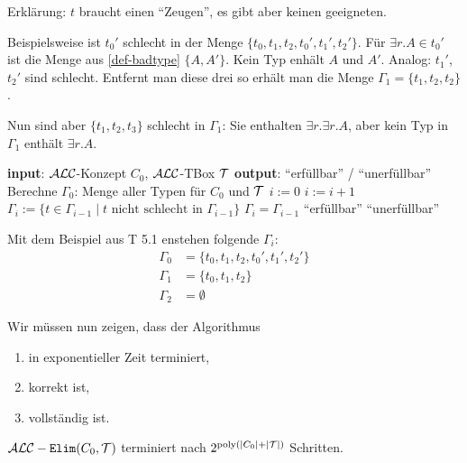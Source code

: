 Erklärung: $t$ braucht einen \enquote{Zeugen}, es gibt aber keinen
geeigneten.

\begin{tafel}[continues=t:synTyp]

    Beispielsweise ist $t_0'$ schlecht in der Menge $\{t_0,t_1,t_2,t_0',t_1',t_2'\}$. Für $\exists r.A \in t_0'$ ist die Menge aus \autoref{def-badtype} $\{A,A'\}$. Kein Typ enhält $A$ und $A'$. Analog: $t_1'$, $t_2'$ sind schlecht. Entfernt man diese drei so erhält man die Menge $\Gamma_1 = \{t_1,t_2,t_2\}$. 

Nun sind aber $\{t_1,t_2,t_3\}$ schlecht in $\Gamma_1$: Sie enthalten $\exists r. \exists r.A$, aber kein Typ in $\Gamma_1$ enthält $\exists r.A$.
\end{tafel}

\begin{algorithmic}
    \State \textbf{input}: $\mathcal{A}\mathcal{L}\mathcal{C}$-Konzept $C_0$, $\mathcal{A}\mathcal{L}\mathcal{C}$-TBox $\mathcal{T}$
    \State \textbf{output}: \enquote{erfüllbar} / \enquote{unerfüllbar}
    \State Berechne $\Gamma_0$: Menge aller Typen für $C_0$ und $\mathcal{T}$
    \State $i := 0$
    \Repeat
        \State $i := i + 1$
        \State $\Gamma_i := \{ t \in \Gamma_{i - 1} \mid t \text{ nicht schlecht in } \Gamma_{i - 1}\}$
    \Until $\Gamma_i = \Gamma_{i - 1}$
        \Return \enquote{erfüllbar}
    \Else{}
        \Return \enquote{unerfüllbar}
    \EndIf
    \EndProcedure{}
\end{algorithmic}

\begin{tafel}[continues=t:synTyp]
    Mit dem Beispiel aus T 5.1 enstehen folgende $\Gamma_i$:
    \begin{align*}
        \Gamma_0 &= \{t_0, t_1, t_2, t_0', t_1', t_2'\}\\
        \Gamma_1 &= \{t_0, t_1, t_2\}\\
        \Gamma_2 &= \emptyset
    \end{align*}
\end{tafel}

Wir müssen nun zeigen, dass der Algorithmus
\begin{enumerate}
    \item in exponentieller Zeit terminiert,
    \item korrekt ist,
    \item vollständig ist.
\end{enumerate}

\begin{lemma}
    $\mathcal{A}\mathcal{L}\mathcal{C}-\texttt{Elim}(C_0,\mathcal{T})$ terminiert nach $2^{\text{poly}(|C_0|+|\mathcal{T}|)}$ Schritten.
\end{lemma}

